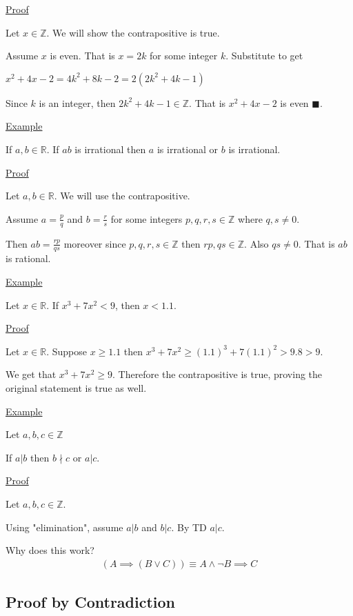 \documentclass{article}
\begin{document}
\underline{Proof}

Let $x \in \mathbb{Z}$. We will show the contrapositive is true.

Assume $x$ is even. That is $x = 2k$ for some integer $k$. Substitute to get 

$x^2 + 4x - 2 =4k^2 + 8k - 2 = 2(2k^2 + 4k-1)$

Since $k$ is an integer, then $2k^2 + 4k-1 \in \mathbb{Z}$. That is $x^2 + 4x-2$ is even $\blacksquare$.

\underline{Example}

If $a,b \in \mathbb{R}$. If $ab$ is irrational then $a$ is irrational or $b$ is irrational.

\underline{Proof}

Let $a,b \in \mathbb{R}$. We will use the contrapositive.

Assume $a = \frac{p}{q}$ and $b = \frac{r}{s}$ for some integers $p,q,r,s \in \mathbb{Z}$ where $q,s \ne 0$.

Then $ab = \frac{rp}{qs}$ moreover since $p,q,r,s \in \mathbb{Z}$ then $rp, qs \in \mathbb{Z}$. Also $qs \ne 0$. That is $ab$ is rational.


\underline{Example}

Let $x \in \mathbb{R}$. If $x^3 + 7x^2 < 9$, then $x < 1.1$.

\underline{Proof}

Let $x \in \mathbb{R}$. Suppose $x \ge 1.1$ then $x^3 + 7x^2 \ge (1.1)^3 + 7(1.1)^2 > 9.8 > 9$.

We get that $x^3 + 7x^2 \ge 9$. Therefore the contrapositive is true, proving the original statement is true as well.

\underline{Example}

Let $a,b,c \in \mathbb{Z}$

If $a \vert b$ then $b \nmid c$ or $a \vert c$.

\underline{Proof}

Let $a,b,c \in \mathbb{Z}$.

Using "elimination", assume $a \vert b$ and $b \vert c$. By TD $a \vert c$.

Why does this work?
\begin{align*}
    (A \implies (B \vee C)) \equiv A \wedge \neg B \implies C
\end{align*}

\subsection{Proof by Contradiction}
\end{document}
